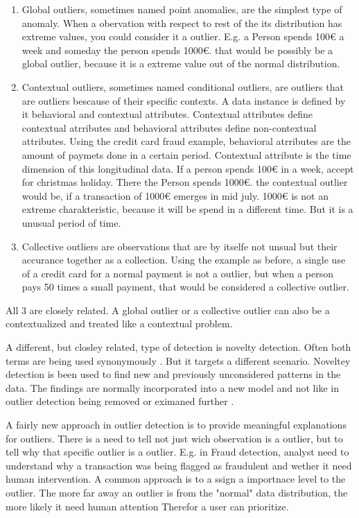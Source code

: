 \begin{enumerate}
\item Global outliers, sometimes named point anomalies, are the simplest type of anomaly. 
When a obervation with respect to rest of the its distribution has extreme values, you could consider it a outlier.
E.g. a Person spends 100€ a week and someday the person spends 1000€. that would be possibly be a global outlier, because it is 
a extreme value out of the normal distribution. 
\item Contextual outliers, sometimes named conditional outliers, are outliers that are outliers bescause of their specific contexts.
A data instance is defined by it behavioral and contextual attributes. 
Contextual attributes define contextual atrributes and behavioral attributes define non-contextual attributes.
Using the credit card fraud example, behavioral atrributes are the amount of paymets done in a certain period.
Contextual attribute is the time dimension of this longitudinal data. 
If a person spends 100€ in a week, accept for christmas holiday. There the Person spends 1000€.
the contextual outlier would be, if a transaction of 1000€ emerges in mid july.
1000€ is not an extreme charakteristic, because it will be spend in a different time.
But it is a unusual period of time. 
\item Collective outliers are observations that are by itselfe not unsual but their accurance together as a collection. 
Using the example as before, a single use of a credit card for a normal payment is not a outlier, but when a person pays 50 times
a small payment, that would be considered a collective outlier.
\end{enumerate}


All 3 are closely related. A global outlier or a collective outlier can also be a contextualized and treated like a 
contextual problem. 


A different, but closley related, type of detection is novelty detection. Often both terms are being used synonymously \citep{domingues2019probabilistic}.
But it targets a different scenario. 
Noveltey detection is been used to find new and previously unconsidered patterns in the data.
The findings are normally incorporated into a new model and not like in outlier detection being removed or eximaned further \citep{chandola2009anomaly}.


A fairly new approach in outlier detection is to provide meaningful explanations for outliers.
There is a need to tell not just wich observation is a outlier, but to tell why that specific outlier is a outlier.
E.g. in Fraud detection, analyst need to understand why a transaction was being flagged as fraudulent and wether it need human intervention.
A common approach is to a ssign a importnace level to the outlier.
The more far away an outlier is from the "normal" data distribution, the more likely it need human attention 
Therefor a user can prioritize. 


